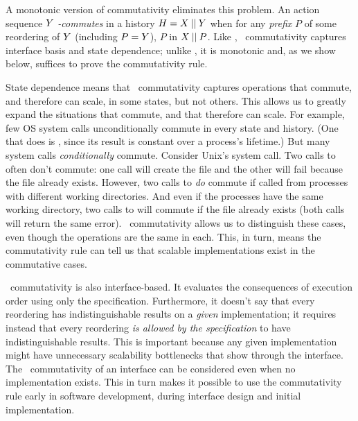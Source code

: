 A monotonic version of commutativity eliminates this problem.
%
An action sequence $Y$ \emph{\SRI-commutes} in a history $H = X \mathbin{||}
Y$ when for any \emph{prefix} $P$ of some reordering of $Y$ (including
$P = Y$), $P$ \integrallycommutes in $X \mathbin{||} P$.
%
Like \integralcommutativity, \SRI\ commutativity captures 
interface basis and state dependence; unlike \integralcommutativity, it
is monotonic and, as we show below, suffices to prove the
commutativity rule.

State dependence means that \SRI\ commutativity captures operations that
commute, and therefore can scale, in some states, but not others.
%
This allows us to greatly expand the situations that commute,
and that therefore can scale.
%
For example, few OS system calls unconditionally commute in
every state and history.
%
(One that does is , since its result is constant over a process's
lifetime.)
%
But many system calls \emph{conditionally} commute.
%
Consider Unix's  system call.
%
Two calls to  often don't
commute: one call will create the file and the other will
fail because the file already exists.
%
However, two calls to  \emph{do}
commute if called from processes with different working
directories.  And even if the processes have the same working
directory, two calls to  will commute
{if the file already exists} (both
calls will return the same error).
%
\SRI\ commutativity allows us to distinguish these cases, even though the
operations are the same in each.  This, in turn, means the commutativity
rule can tell us that scalable implementations exist in the commutative
cases.


\SRI\ commutativity is also interface-based.
%
It evaluates the consequences of execution order using only the
specification.
%
Furthermore, it doesn't say that every reordering has indistinguishable
results on a \emph{given} implementation; it requires instead that
every reordering \emph{is allowed by the specification} to have
indistinguishable results. This is important because any given implementation might
have unnecessary scalability bottlenecks that show through the
interface. The \SRI\ commutativity of an interface can be
considered even when no implementation exists. This in turn makes it
possible to use the commutativity rule early in software development,
during interface design and initial implementation.

